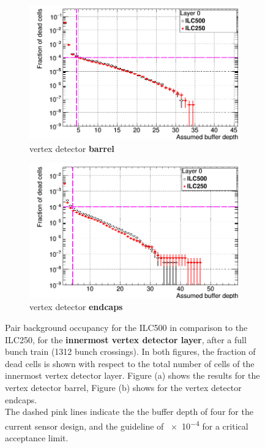 \begin{figure}
 \centering
  \begin{subfigure}[b]{0.49\textwidth}
   \centering
    \includegraphics[width=\textwidth]{Figures/Pairs/Occupancy_Comparison_Layer_0_deadcells_ILC500vsILC250_SiVertexBarrel_corrected_Barrel_size.png}
   \caption{\sid vertex detector \textbf{barrel}}
   \end{subfigure}
   \hfill
    \begin{subfigure}[b]{0.49\textwidth}
   \centering
    \includegraphics[width=\textwidth]{Figures/Pairs/Occupancy_Comparison_Layer_0_deadcells_ILC500vsILC250_SiVertexEndcap.png}
   \caption{\sid vertex detector \textbf{endcaps}}
   \end{subfigure}
   \caption[Pair background occupancy in the \sid vertex detector for the ILC500 and the ILC250]{Pair background occupancy for the ILC500 in comparison to the ILC250, for the \textbf{innermost \sid vertex detector layer}, after a full bunch train (\num{1312} bunch crossings).
   In both figures, the fraction of dead cells is shown with respect to the total number of cells of the innermost vertex detector layer.
   Figure (a) shows the results for the vertex detector barrel, Figure (b) shows for the vertex detector endcaps.
   \\The dashed pink lines indicate the the buffer depth of four for the current sensor design, and the guideline of \num{e-4} for a critical acceptance limit.
   }
   \label{fig:PairBkg:ILC500-ILC250_Occupancy}
\end{figure}
